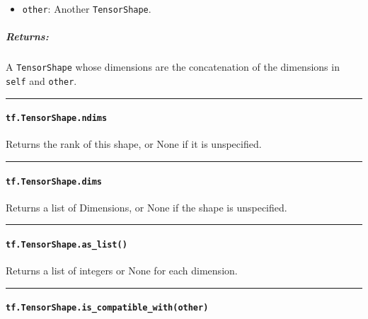\begin{itemize}
\tightlist
\item
  \lstinline{other}: Another \lstinline{TensorShape}.
\end{itemize}

\subparagraph{Returns: }\label{returns-32}

A \lstinline{TensorShape} whose dimensions are the concatenation of the
dimensions in \lstinline{self} and \lstinline{other}.

\begin{center}\rule{0.5\linewidth}{\linethickness}\end{center}

\paragraph{\texorpdfstring{\lstinline{tf.TensorShape.ndims}
}{tf.TensorShape.ndims }}\label{tf.tensorshape.ndims}

Returns the rank of this shape, or None if it is unspecified.

\begin{center}\rule{0.5\linewidth}{\linethickness}\end{center}

\paragraph{\texorpdfstring{\lstinline{tf.TensorShape.dims}
}{tf.TensorShape.dims }}\label{tf.tensorshape.dims}

Returns a list of Dimensions, or None if the shape is unspecified.

\begin{center}\rule{0.5\linewidth}{\linethickness}\end{center}

\paragraph{\texorpdfstring{\lstinline{tf.TensorShape.as_list()}
}{tf.TensorShape.as_list() }}\label{tf.tensorshape.asux5flist}

Returns a list of integers or None for each dimension.

\begin{center}\rule{0.5\linewidth}{\linethickness}\end{center}

\paragraph{\texorpdfstring{\lstinline{tf.TensorShape.is_compatible_with(other)}
}{tf.TensorShape.is_compatible_with(other) }}\label{tf.tensorshape.isux5fcompatibleux5fwithother}

